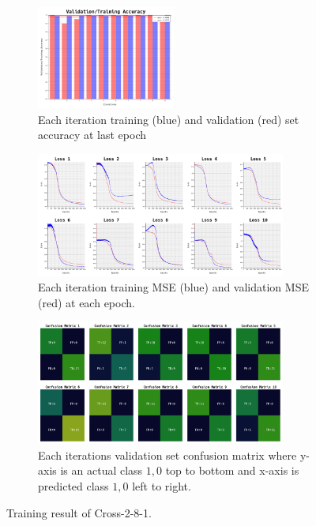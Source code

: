 \documentclass{article}
\begin{document}
\begin{figure}[ht]
	\begin{subfigure}{\textwidth}
		\centering
		\includegraphics[width=0.5\textwidth]{cross-2-8-1/acc}
		\caption{Each iteration training (blue) and validation (red) set accuracy at last epoch}
		\label{fig:10a}
	\end{subfigure}
	\begin{subfigure}{\textwidth}
		\centering
		\includegraphics[width=0.9\textwidth]{cross-2-8-1/loss}
		\caption{Each iteration training MSE (blue) and validation MSE (red) at each epoch.}
		\label{fig:10b}
	\end{subfigure}
	\begin{subfigure}{\textwidth}
		\centering
		\includegraphics[width=0.9\textwidth]{cross-2-8-1/confusion_matrix}
		\caption{Each iterations validation set confusion matrix where y-axis is an actual class $1, 0$ top to bottom and x-axis is predicted class $1, 0$ left to right.}
		\label{fig:10c}
	\end{subfigure}
	\caption{Training result of Cross-2-8-1.}
	\label{fig:10}
\end{figure}
\FloatBarrier
\end{document}
